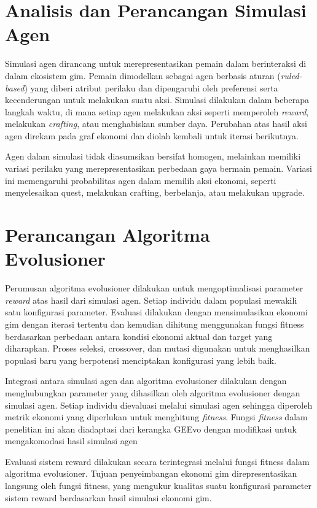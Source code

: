 \section{Analisis dan Perancangan Simulasi Agen}
Simulasi agen dirancang untuk merepresentasikan pemain dalam berinteraksi di dalam ekosistem gim. Pemain dimodelkan sebagai agen berbasis aturan (\textit{ruled-based}) yang diberi atribut perilaku dan dipengaruhi oleh preferensi serta kecenderungan untuk melakukan suatu aksi. Simulasi dilakukan dalam beberapa langkah waktu, di mana setiap agen melakukan aksi seperti memperoleh \textit{reward}, melakukan \textit{crafting}, atau menghabiskan sumber daya. Perubahan atas hasil aksi agen direkam pada graf ekonomi dan diolah kembali untuk iterasi berikutnya.

Agen dalam simulasi tidak diasumsikan bersifat homogen, 
melainkan memiliki variasi perilaku yang 
merepresentasikan perbedaan gaya bermain pemain. 
Variasi ini memengaruhi probabilitas agen dalam 
memilih aksi ekonomi, seperti menyelesaikan quest, 
melakukan crafting, berbelanja, atau melakukan upgrade.

\section{Perancangan Algoritma Evolusioner}
Perumusan algoritma evolusioner dilakukan untuk mengoptimalisasi parameter \textit{reward} atas hasil dari simulasi agen. Setiap individu dalam populasi mewakili satu konfigurasi parameter. Evaluasi dilakukan dengan mensimulasikan ekonomi gim dengan iterasi tertentu dan kemudian dihitung menggunakan fungsi fitness berdasarkan perbedaan antara kondisi ekonomi aktual dan target yang diharapkan. Proses seleksi, crossover, dan mutasi digunakan untuk menghasilkan populasi baru yang berpotensi menciptakan konfigurasi yang lebih baik. 

Integrasi antara simulasi agen dan algoritma evolusioner dilakukan dengan menghubungkan parameter yang dihasilkan oleh algoritma evolusioner dengan simulasi agen. Setiap individu dievaluasi melalui simulasi agen sehingga diperoleh metrik ekonomi yang diperlukan untuk menghitung \textit{fitness}. Fungsi \textit{fitness} dalam penelitian ini akan diadaptasi dari kerangka GEEvo 
dengan modifikasi untuk mengakomodasi hasil simulasi agen

Evaluasi sistem reward dilakukan secara terintegrasi
melalui fungsi fitness dalam algoritma evolusioner. Tujuan penyeimbangan
ekonomi gim direpresentasikan langsung oleh fungsi fitness, yang
mengukur kualitas suatu konfigurasi parameter sistem reward berdasarkan
hasil simulasi ekonomi gim.

